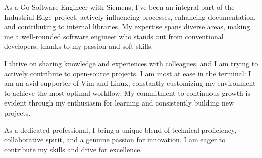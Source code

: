 

\begin{cvparagraph}

As a Go Software Engineer with Siemens, I’ve been an integral part of the Industrial Edge project, actively influencing processes, enhancing documentation, and contributing to internal libraries. My expertise spans diverse areas, making me a well‑rounded software engineer who stands out from conventional developers, thanks to my passion and soft skills.

I thrive on sharing knowledge and experiences with colleagues, and I am trying to actively contribute to open‑source projects. I am most at ease in the terminal: I am an avid supporter of Vim and Linux, constantly customizing my environment to achieve the most optimal workflow. My commitment to continuous growth is evident through my enthusiasm for learning and consistently building new projects.

As a dedicated professional, I bring a unique blend of technical proficiency, collaborative spirit, and a genuine passion for innovation. I am eager to contribute my skills and drive for excellence.
\end{cvparagraph}
